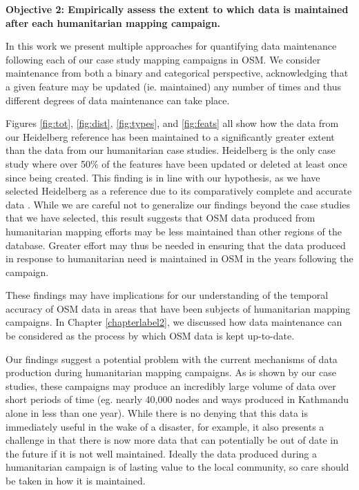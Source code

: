\noindent\textbf{Objective 2: Empirically assess the extent to which data is maintained after each humanitarian mapping campaign.}

In this work we present multiple approaches for quantifying data maintenance following each of our case study mapping campaigns in OSM. We consider maintenance from both a binary and categorical perspective, acknowledging that a given feature may be updated (ie. maintained) any number of times and thus different degrees of data maintenance can take place. 

Figures \ref{fig:tot}, \ref{fig:dist}, \ref{fig:types}, and \ref{fig:feats} all show how the data from our Heidelberg reference has been maintained to a significantly greater extent than the data from our humanitarian case studies. Heidelberg is the only case study where over 50\% of the features have been updated or deleted at least once since being created. This finding is in line with our hypothesis, as we have selected Heidelberg as a reference due to its comparatively complete and accurate data \parencite{arsanjani_assessing_2013}. While we are careful not to generalize our findings beyond the case studies that we have selected, this result suggests that OSM data produced from humanitarian mapping efforts may be less maintained than other regions of the database. Greater effort may thus be needed in ensuring that the data produced in response to humanitarian need is maintained in OSM in the years following the campaign. 

These findings may have implications for our understanding of the temporal accuracy of OSM data in areas that have been subjects of humanitarian mapping campaigns. In Chapter \ref{chapterlabel2}, we discussed how data maintenance can be considered as the process by which OSM data is kept up-to-date. 

Our findings suggest a potential problem with the current mechanisms of data production during humanitarian mapping campaigns. As is shown by our case studies, these campaigns may produce an incredibly large volume of data over short periods of time (eg. nearly 40,000 nodes and ways produced in Kathmandu alone in less than one year). While there is no denying that this data is immediately useful in the wake of a disaster, for example, it also presents a challenge in that there is now more data that can potentially be out of date in the future if it is not well maintained. Ideally the data produced during a humanitarian campaign is of lasting value to the local community, so care should be taken in how it is maintained.

